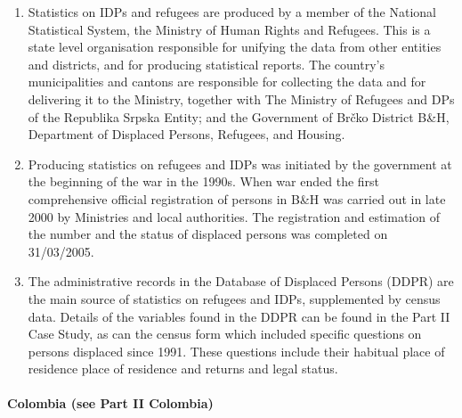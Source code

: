\documentclass[
]{article}
\begin{document}
\begin{enumerate}
\def\labelenumi{\arabic{enumi}.}
\setcounter{enumi}{174}
\item
  Statistics on IDPs and refugees are produced by a member of the
  National Statistical System, the Ministry of Human Rights and
  Refugees. This is a state level organisation responsible for
  unifying the data from other entities and districts, and for
  producing statistical reports. The country's municipalities and
  cantons are responsible for collecting the data and for delivering
  it to the Ministry, together with The Ministry of Refugees and DPs
  of the Republika Srpska Entity; and the Government of Brčko District
  B\&H, Department of Displaced Persons, Refugees, and Housing.
\item
  Producing statistics on refugees and IDPs was initiated by the
  government at the beginning of the war in the 1990s. When war ended
  the first comprehensive official registration of persons in B\&H was
  carried out in late 2000 by Ministries and local authorities. The
  registration and estimation of the number and the status of
  displaced persons was completed on 31/03/2005.
\item
  The administrative records in the Database of Displaced Persons
  (DDPR) are the main source of statistics on refugees and IDPs,
  supplemented by census data. Details of the variables found in the
  DDPR can be found in the Part II Case Study, as can the census form
  which included specific questions on persons displaced since 1991.
  These questions include their habitual place of residence place of
  residence and returns and legal status.
\end{enumerate}

\hypertarget{colombia-see-part-ii-colombia-1}{%
\paragraph{Colombia (see Part II Colombia)}\label{colombia-see-part-ii-colombia-1}}
\end{document}
